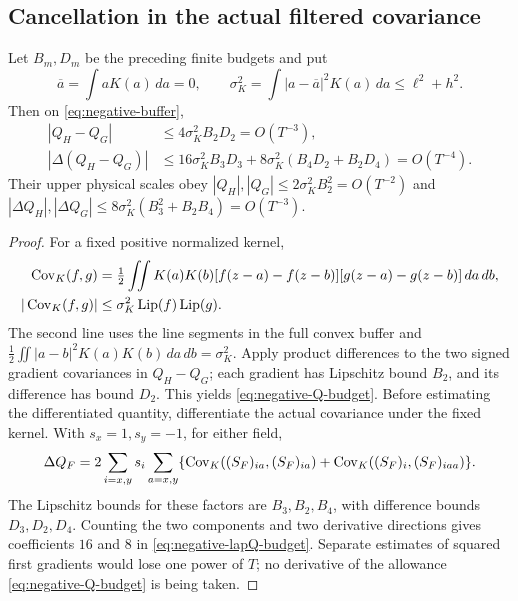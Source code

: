 \subsection{Cancellation in the actual filtered covariance}
\begin{proposition}
\label{prop:negative-covariance}
Let $B_m,D_m$ be the preceding finite budgets and put
\[
 \overline a=\int aK(a)\,da=0,\qquad
 \sigma_K^2=\int|a-\overline a|^2K(a)\,da\le\ell^2+h^2.
\]
Then on \eqref{eq:negative-buffer},
\begin{align}
 |Q_H-Q_G|&\le4\sigma_K^2B_2D_2=O(T^{-3}),
 \label{eq:negative-Q-budget}\\
 |\Delta(Q_H-Q_G)|&\le16\sigma_K^2B_3D_3
       +8\sigma_K^2(B_4D_2+B_2D_4)=O(T^{-4}).
 \label{eq:negative-lapQ-budget}
\end{align}
Their upper physical scales obey
$|Q_H|,|Q_G|\le2\sigma_K^2B_2^2=O(T^{-2})$ and
$|\Delta Q_H|,|\Delta Q_G|\le8\sigma_K^2(B_3^2+B_2B_4)=O(T^{-3})$.
\end{proposition}
\begin{proof}
For a fixed positive normalized kernel,
\begin{align}
 \operatorname{Cov}_K(f,g)
 &=\tfrac12\iint K(a)K(b)
 [f(z-a)-f(z-b)][g(z-a)-g(z-b)]\,da\,db,\notag\\
 |\operatorname{Cov}_K(f,g)|&\le\sigma_K^2\operatorname{Lip}(f)
                                      \operatorname{Lip}(g).
 \label{eq:negative-two-point-covariance}
\end{align}
The second line uses the line segments in the full convex buffer and
$\frac12\iint|a-b|^2K(a)K(b)\,da\,db=\sigma_K^2$.
Apply product differences to the two signed gradient covariances in
$Q_H-Q_G$; each gradient has Lipschitz bound $B_2$, and its difference
has bound $D_2$. This yields \eqref{eq:negative-Q-budget}.
Before estimating the differentiated quantity, differentiate the actual
covariance under the fixed kernel. With $s_x=1,s_y=-1$, for either field,
\begin{equation}
 \Delta Q_F=2\sum_{i=x,y}s_i\sum_{a=x,y}
 \{\operatorname{Cov}_K((S_F)_{ia},(S_F)_{ia})
       +\operatorname{Cov}_K((S_F)_i,(S_F)_{iaa})\}.
 \label{eq:negative-differentiated-covariance}
\end{equation}
The Lipschitz bounds for these factors are $B_3,B_2,B_4$, with
difference bounds $D_3,D_2,D_4$. Counting the two components and two
derivative directions gives coefficients $16$ and $8$ in
\eqref{eq:negative-lapQ-budget}. Separate estimates of squared first
gradients would lose one power of $T$; no derivative of the allowance
\eqref{eq:negative-Q-budget} is being taken.
\end{proof}

